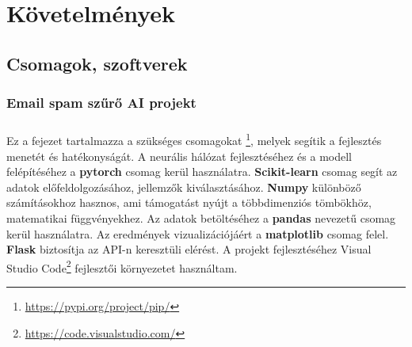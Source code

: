 ﻿\chapter{Követelmények}

\section{Csomagok, szoftverek}
\subsection{Email spam szűrő AI projekt}
\paragraph{}
Ez a fejezet tartalmazza a szükséges csomagokat \footnote{\href{https://pypi.org/project/pip/}{https://pypi.org/project/pip/}}, melyek segítik a fejlesztés menetét és hatékonyságát.
A neurális hálózat fejlesztéséhez és a modell felépítéséhez a \textbf{pytorch} csomag kerül használatra.
\textbf{Scikit-learn} csomag segít az adatok előfeldolgozásához, jellemzők kiválasztásához. \textbf{Numpy} különböző számításokhoz hasznos, ami támogatást nyújt a többdimenziós tömbökhöz, matematikai függvényekhez.
Az adatok betöltéséhez a \textbf{pandas} nevezetű csomag kerül használatra.
Az eredmények vizualizációjáért a \textbf{matplotlib} csomag felel.
\textbf{Flask} biztosítja az API-n keresztüli elérést.
A projekt fejlesztéséhez Visual Studio Code\footnote{\href{https://code.visualstudio.com/}{https://code.visualstudio.com/}} fejlesztői környezetet használtam.